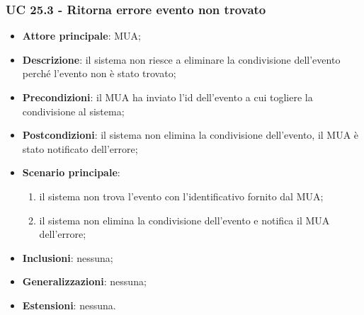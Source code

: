 \subsubsection{UC 25.3 - Ritorna errore evento non trovato} \label{sec:UC25.3}
    \begin{itemize}
        \item \textbf{Attore principale}: MUA;
        \item \textbf{Descrizione}: il sistema non riesce a eliminare la condivisione dell'evento perché l'evento non è stato trovato;
        \item \textbf{Precondizioni}: il MUA ha inviato l'id dell'evento a cui togliere la condivisione al sistema;
        \item \textbf{Postcondizioni}: il sistema non elimina la condivisione dell'evento, il MUA è stato notificato dell'errore;
        \item \textbf{Scenario principale}:
            \begin{enumerate}
                \item il sistema non trova l'evento con l'identificativo fornito dal MUA;
                \item il sistema non elimina la condivisione dell'evento e notifica il MUA dell'errore;
            \end{enumerate}
        \item \textbf{Inclusioni}: nessuna;
        \item \textbf{Generalizzazioni}: nessuna;
        \item \textbf{Estensioni}: nessuna.
    \end{itemize}

